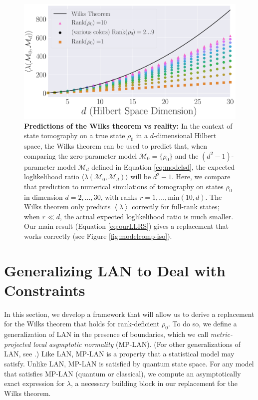 \documentclass[aps,pra, twocolumn]{revtex4-1}
\newcommand{\M}{\mathcal{M}}
\newcommand{\expect}[1]{\ensuremath{\left\langle#1\right\rangle}}
\begin{document}
\begin{figure}
\includegraphics[width=\columnwidth]{Images/Figure_2.pdf}
 \caption{\textbf{Predictions of the Wilks theorem vs reality:}  In the context of state tomography on a true state $\rho_0$ in a $d$-dimensional Hilbert space, the Wilks theorem can be used to predict that, when comparing the zero-parameter model $\M_{0} = \{\rho_0\}$ and the $(d^2-1)$-parameter model $\mathcal{M}_d$ defined in Equation \eqref{eq:modelsd}, the expected loglikelihood ratio $\langle \lambda(\M_{0}, \M_{d})\rangle$ will be $d^2-1$.  Here, we compare that prediction to numerical simulations of tomography on states $\rho_0$ in dimension $d=2,\ldots,30$, with ranks $r=1,\ldots,\mathrm{min}(10,d)$.  The Wilks theorem only predicts $\expect{\lambda}$ correctly for full-rank states; when $r \ll d$, the actual expected loglikelihood ratio is much smaller. Our main result (Equation \ref{eq:ourLLRS}) gives a replacement that works correctly (see Figure \ref{fig:modelcomp-iso}).}
\label{fig:boundaries2}
\end{figure}

\section{Generalizing LAN to Deal with Constraints}
\label{sec:lanreplacement}

In this section, we develop a framework that will allow us to derive a replacement for the Wilks theorem that holds for rank-deficient $\rho_{0}$. To do so, we define a generalization of LAN in the presence of boundaries, which we call \emph{metric-projected local asymptotic normality} (MP-LAN). (For other generalizations of LAN, see \cite{Roussas2010, Jeganathan1982}.) Like LAN, MP-LAN is a property that a statistical model may satisfy. Unlike LAN, MP-LAN is satisfied by quantum state space. For any model that satisfies MP-LAN (quantum or classical), we compute an asymptotically exact expression for $\lambda$, a necessary building block in our replacement for the Wilks theorem. 
\end{document}
